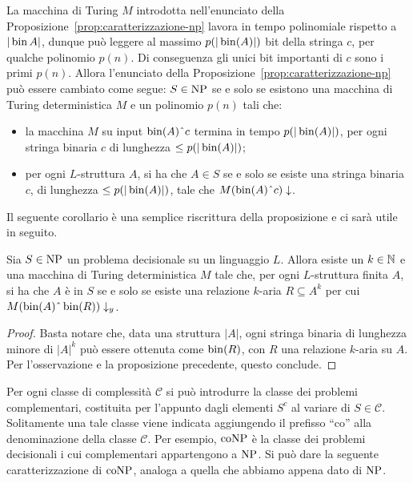 \begin{osservazione}
  La macchina di Turing $M$ introdotta nell'enunciato della Proposizione~\ref{prop:caratterizzazione-np} lavora in tempo polinomiale rispetto a $|\operatorname{bin}{A}|$, dunque può leggere al massimo $p(|\operatorname{bin}(A)|)$ bit della stringa $c$, per qualche polinomio $p(n)$.
  Di conseguenza gli unici bit importanti di $c$ sono i primi $p(n)$.
  Allora l'enunciato della Proposizione~\ref{prop:caratterizzazione-np} può essere cambiato come segue: $S\in\operatorname{NP}$ se e solo se esistono una macchina di Turing deterministica $M$ e un polinomio $p(n)$ tali che:
  \begin{itemize}
    \item la macchina $M$ su input $\bin(A)\string^ c$ termina in tempo $p(|\operatorname{bin}(A)|)$, per ogni stringa binaria $c$ di lunghezza $\leq p(|\operatorname{bin}(A)|)$;
    \item per ogni $L$-struttura $A$, si ha che $A\in S$ se e solo se esiste una stringa binaria $c$, di lunghezza $\leq p(|\operatorname{bin}(A)|)$, tale che $M(\bin(A)\string^ c)\downarrow$.
  \end{itemize}
\end{osservazione}
Il seguente corollario è una semplice riscrittura della proposizione e ci sarà
utile in seguito.
\begin{corollario}
\label{cor:caratterizzazione-np}
  Sia $S \in \operatorname{NP}$ un problema decisionale su un linguaggio $L$. Allora esiste un $k \in \mathbb{N}$ 
  e una macchina di Turing deterministica $M$ tale che, per ogni $L$-struttura finita
  $A$, si ha che $A$ è in $S$ se e solo se esiste una relazione $k$-aria $R \subseteq A^k$
  per cui $M(\bin(A)\string^\bin(R))\downarrow_y$.
\end{corollario}
\begin{proof}
 Basta notare che, data una struttura $|A|$, ogni stringa binaria di lunghezza
 minore di $|A|^k$ può
 essere ottenuta come $\operatorname{bin}(R)$, con $R$ una relazione $k$-aria su $A$.
 Per l'osservazione e la proposizione precedente, questo conclude.
\end{proof}



Per ogni classe di complessità $\mathcal{C}$ si può introdurre la classe dei problemi complementari, costituita per l'appunto dagli elementi $S^c$ al variare di $S\in\mathcal{C}$.
Solitamente una tale classe viene indicata aggiungendo il prefisso ``co'' alla denominazione della classe $\mathcal{C}$.
Per esempio, $\operatorname{coNP}$ è la classe dei problemi decisionali i cui complementari appartengono a $\operatorname{NP}$.
Si può dare la seguente caratterizzazione di $\operatorname{coNP}$, analoga a quella che abbiamo appena dato di $\operatorname{NP}$.

